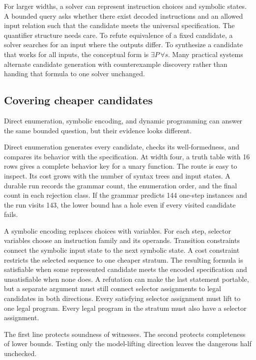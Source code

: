 For larger widths, a solver can represent instruction choices and symbolic
states. A bounded query asks whether there exist decoded instructions and an
allowed input relation such that the candidate meets the universal
specification. The quantifier structure needs care. To refute equivalence of
a fixed candidate, a solver searches for an input where the outputs differ.
To synthesize a candidate that works for all inputs, the conceptual form is
\(\exists P\,\forall s\). Many practical systems alternate candidate
generation with counterexample discovery rather than handing that formula to
one solver unchanged.

\subsection{Covering cheaper candidates}

Direct enumeration, symbolic encoding, and dynamic programming can answer the
same bounded question, but their evidence looks different.

Direct enumeration generates every candidate, checks its well-formedness, and
compares its behavior with the specification. At width four, a truth table with
16 rows gives a complete behavior key for a unary function. The route is easy
to inspect. Its cost grows with the number of syntax trees and input states.
A durable run records the grammar count, the enumeration order, and the final
count in each rejection class. If the grammar predicts 144 one-step instances
and the run visits 143, the lower bound has a hole even if every visited
candidate fails.

A symbolic encoding replaces choices with variables. For each step, selector
variables choose an instruction family and its operands. Transition
constraints connect the symbolic input state to the next symbolic state. A
cost constraint restricts the selected sequence to one cheaper stratum. The
resulting formula is satisfiable when some represented candidate meets the
encoded specification and unsatisfiable when none does. A refutation can make
the last statement portable, but a separate argument must still connect
selector assignments to legal candidates in both directions. Every satisfying
selector assignment must lift to one legal program. Every legal program in the
stratum must also have a selector assignment.

The first line protects soundness of witnesses. The second protects
completeness of lower bounds. Testing only the model-lifting direction leaves
the dangerous half unchecked.

